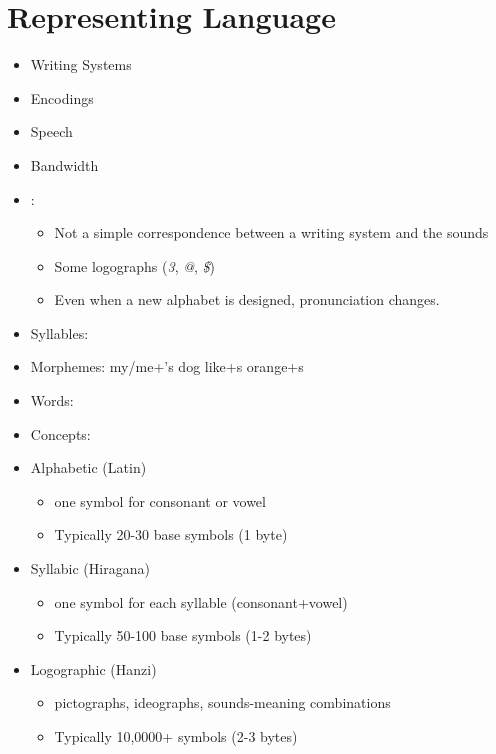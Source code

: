 \documentclass[a4paper,landscape,headrule,footrule,xetex]{foils}
\begin{document}
\section{Representing Language}

\begin{itemize}
\item Writing Systems
\item Encodings
\item Speech
\item Bandwidth
\end{itemize}


\begin{itemize}
\item \ul{}:    
  \begin{itemize}
  \item Not a  simple correspondence between a writing system
    and the sounds
  \item Some logographs (\textit{3}, \textit{@}, \textit{\$})
  \item Even when a new alphabet is designed, pronunciation changes.
  \end{itemize}
\item Syllables:    
\item Morphemes: my/me+'s dog like+s orange+s 
\item Words:  
\item Concepts:   
\end{itemize}


\begin{itemize}
\item Alphabetic (Latin)
  \begin{itemize}
  \item  one symbol for consonant or vowel
  \item Typically 20-30 base symbols (1 byte)
  \end{itemize}
\item Syllabic (Hiragana)
  \begin{itemize}
  \item  one symbol for each syllable (consonant+vowel)
  \item Typically 50-100 base symbols (1-2 bytes)
  \end{itemize}
\item Logographic (Hanzi)
  \begin{itemize}
  \item pictographs, ideographs, sounds-meaning combinations
  \item Typically 10,0000+ symbols (2-3 bytes)
  \end{itemize}


\end{itemize}
\end{document}
